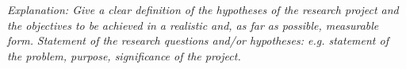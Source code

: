 %

\emph{Explanation: Give a clear definition of the hypotheses of the research
project and the objectives to be achieved in a realistic and, as far as
possible, measurable form.}
\emph{Statement of the research questions and/or hypotheses: e.g. statement of the problem, purpose, significance of the project.
}






% 
